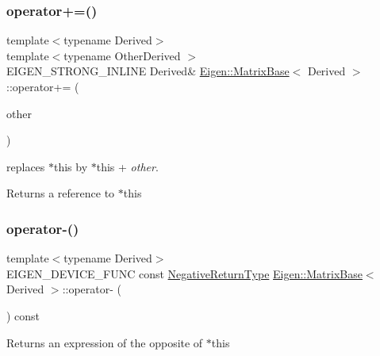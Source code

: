 \subsubsection{\texorpdfstring{operator+=()}{operator+=()}}
{\footnotesize\ttfamily template$<$typename Derived$>$ \\
template$<$typename Other\+Derived $>$ \\
E\+I\+G\+E\+N\+\_\+\+S\+T\+R\+O\+N\+G\+\_\+\+I\+N\+L\+I\+NE Derived\& \mbox{\hyperlink{class_eigen_1_1_matrix_base}{Eigen\+::\+Matrix\+Base}}$<$ Derived $>$\+::operator+= (\begin{DoxyParamCaption}\item[{const \mbox{\hyperlink{class_eigen_1_1_matrix_base}{Matrix\+Base}}$<$ Other\+Derived $>$ \&}]{other }\end{DoxyParamCaption})}

replaces {\ttfamily $\ast$this} by {\ttfamily $\ast$this} + {\itshape other}.

\begin{DoxyReturn}{Returns}
a reference to {\ttfamily $\ast$this} 
\end{DoxyReturn}
\mbox{\label{class_eigen_1_1_matrix_base_a65cba62d44d32bce299e17f2d8970277}} 
\subsubsection{\texorpdfstring{operator-\/()}{operator-()}}
{\footnotesize\ttfamily template$<$typename Derived$>$ \\
E\+I\+G\+E\+N\+\_\+\+D\+E\+V\+I\+C\+E\+\_\+\+F\+U\+NC const \mbox{\hyperlink{class_eigen_1_1_cwise_unary_op}{Negative\+Return\+Type}} \mbox{\hyperlink{class_eigen_1_1_matrix_base}{Eigen\+::\+Matrix\+Base}}$<$ Derived $>$\+::operator-\/ (\begin{DoxyParamCaption}{ }\end{DoxyParamCaption}) const\hspace{0.3cm}{\ttfamily [inline]}}

\begin{DoxyReturn}{Returns}
an expression of the opposite of {\ttfamily $\ast$this} 
\end{DoxyReturn}
\mbox{\label{class_eigen_1_1_matrix_base_a777151d0c1c310c3bbfc0d203f774910}} 
